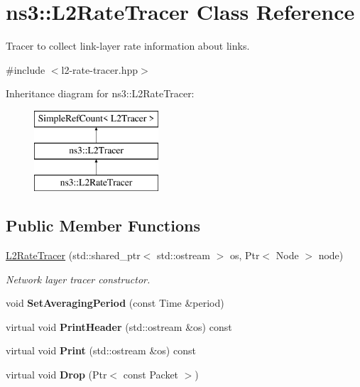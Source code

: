 \hypertarget{classns3_1_1L2RateTracer}{}\section{ns3\+:\+:L2\+Rate\+Tracer Class Reference}
\label{classns3_1_1L2RateTracer}


Tracer to collect link-\/layer rate information about links.  




{\ttfamily \#include $<$l2-\/rate-\/tracer.\+hpp$>$}

Inheritance diagram for ns3\+:\+:L2\+Rate\+Tracer\+:\begin{figure}[H]
\begin{center}
\leavevmode
\includegraphics[height=3.000000cm]{classns3_1_1L2RateTracer}
\end{center}
\end{figure}
\subsection*{Public Member Functions}
\begin{DoxyCompactItemize}
\item 
\hyperlink{classns3_1_1L2RateTracer_aaac3b675fe828684b648ab7c756e811a}{L2\+Rate\+Tracer} (std\+::shared\+\_\+ptr$<$ std\+::ostream $>$ os, Ptr$<$ Node $>$ node)\hypertarget{classns3_1_1L2RateTracer_aaac3b675fe828684b648ab7c756e811a}{}\label{classns3_1_1L2RateTracer_aaac3b675fe828684b648ab7c756e811a}

\begin{DoxyCompactList}\small\item\em Network layer tracer constructor. \end{DoxyCompactList}\item 
void {\bfseries Set\+Averaging\+Period} (const Time \&period)\hypertarget{classns3_1_1L2RateTracer_ab16892cfefc246d658e8fc3f61743bf5}{}\label{classns3_1_1L2RateTracer_ab16892cfefc246d658e8fc3f61743bf5}

\item 
virtual void {\bfseries Print\+Header} (std\+::ostream \&os) const\hypertarget{classns3_1_1L2RateTracer_a46952f96a0a2f8366ea04ce74cbb20ae}{}\label{classns3_1_1L2RateTracer_a46952f96a0a2f8366ea04ce74cbb20ae}

\item 
virtual void {\bfseries Print} (std\+::ostream \&os) const\hypertarget{classns3_1_1L2RateTracer_a9e4a624aea5f2223180b85d8d459928a}{}\label{classns3_1_1L2RateTracer_a9e4a624aea5f2223180b85d8d459928a}

\item 
virtual void {\bfseries Drop} (Ptr$<$ const Packet $>$)\hypertarget{classns3_1_1L2RateTracer_a97719ef882cba2a4c8a1a649992244a2}{}\label{classns3_1_1L2RateTracer_a97719ef882cba2a4c8a1a649992244a2}

\end{DoxyCompactItemize}
